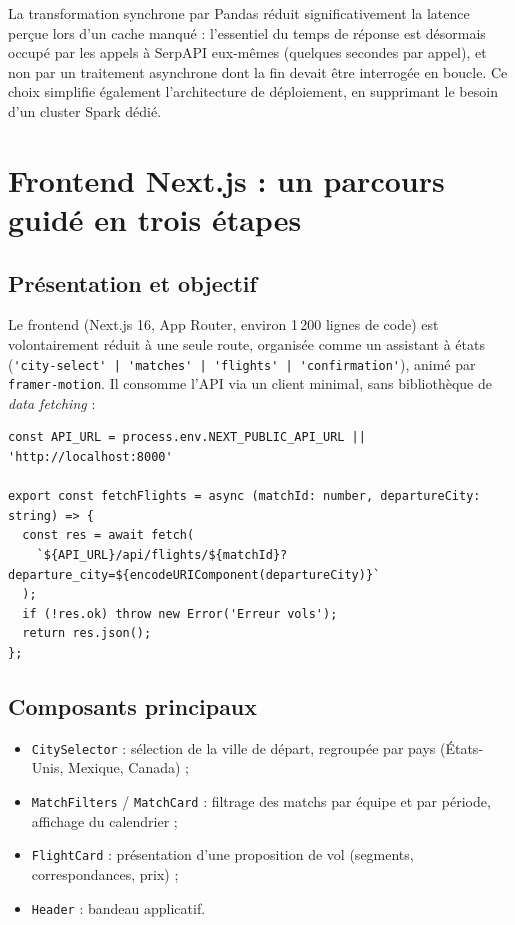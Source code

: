 \documentclass[11pt,a4paper]{report}
\newcommand{\code}[1]{\lstinline{#1}}
\begin{document}
La transformation synchrone par Pandas réduit significativement la latence perçue lors d'un cache manqué : l'essentiel du temps de réponse est désormais occupé par les appels à SerpAPI eux-mêmes (quelques secondes par appel), et non par un traitement asynchrone dont la fin devait être interrogée en boucle. Ce choix simplifie également l'architecture de déploiement, en supprimant le besoin d'un cluster Spark dédié.

\section{Frontend Next.js : un parcours guidé en trois étapes}

\subsection{Présentation et objectif}

Le frontend (Next.js 16, App Router, environ 1\,200 lignes de code) est volontairement réduit à une seule route, organisée comme un assistant à états (\code{'city-select' | 'matches' | 'flights' | 'confirmation'}), animé par \code{framer-motion}. Il consomme l'API via un client minimal, sans bibliothèque de \emph{data fetching} :

\begin{lstlisting}[caption={\code{frontend/src/lib/api.ts} -- client API minimal}]
const API_URL = process.env.NEXT_PUBLIC_API_URL || 'http://localhost:8000'

export const fetchFlights = async (matchId: number, departureCity: string) => {
  const res = await fetch(
    `${API_URL}/api/flights/${matchId}?departure_city=${encodeURIComponent(departureCity)}`
  );
  if (!res.ok) throw new Error('Erreur vols');
  return res.json();
};
\end{lstlisting}

\subsection{Composants principaux}

\begin{itemize}
  \item \code{CitySelector} : sélection de la ville de départ, regroupée par pays (États-Unis, Mexique, Canada) ;
  \item \code{MatchFilters} / \code{MatchCard} : filtrage des matchs par équipe et par période, affichage du calendrier ;
  \item \code{FlightCard} : présentation d'une proposition de vol (segments, correspondances, prix) ;
  \item \code{Header} : bandeau applicatif.
\end{itemize}
\end{document}
